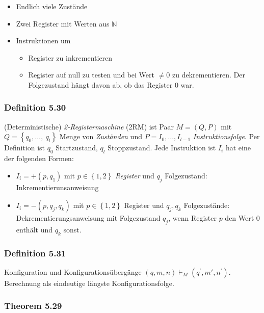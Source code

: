 \begin{itemize}
\item
  Endlich viele Zustände
\item
  Zwei Register mit Werten aus $\mathbb{N}$
\item
  Instruktionen um

  \begin{itemize}
  \item
    Register zu inkrementieren
  \item
    Register auf null zu testen und bei Wert $\neq 0$ zu
    dekrementieren. Der Folgezustand hängt davon ab, ob das Register
    $0$ war.
  \end{itemize}
\end{itemize}

\subsubsection{Definition 5.30}\label{definition-5.30}

(Deterministische) \emph{2-Registermaschine} (2RM) ist Paar
$M = \left( Q,P \right)$ mit
$Q = \left\{ q_{0},\ldots,\ q_{l} \right\}$ Menge von \emph{Zuständen}
und $P = I_{0},\ldots,I_{l - 1}$ \emph{Instruktionsfolge}. Per
Definition ist $q_{0}$ Startzustand, $q_{l}$ Stoppzustand. Jede
Instruktion ist $I_{i}$ hat eine der folgenden Formen:

\begin{itemize}
\item
  $I_{i} = + (p,q_{1})$ mit $p \in \left\{ 1,2 \right\}$
  \emph{Register} und $q_{j}$ Folgezustand: Inkrementierunsanweisung
\item
  $I_{i} = - (p,q_{j},q_{k})$ mit $p \in \left\{ 1,2 \right\}$
  Register und $q_{j},q_{k}$ Folgezustände: Dekrementierungsanweisung
  mit Folgezustand $q_{j}$, wenn Register $p$ den Wert $0$ enthält
  und $q_{k}$ sonst.
\end{itemize}

\subsubsection{Definition 5.31}\label{definition-5.31}

Konfiguration und Konfigurationsübergänge
$\left( q,m,n \right) \vdash_{M}(q^{'},m',n^{'})$. Berechnung als
eindeutige längste Konfigurationsfolge.

\subsubsection{Theorem 5.29}\label{theorem-5.29}

